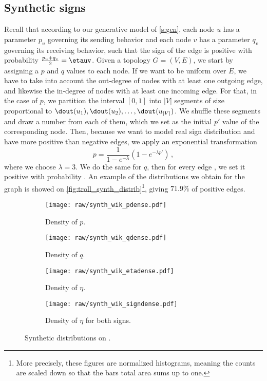 \subsection{Synthetic signs}

Recall that according to our generative model of \autoref{s:gen}, each node $u$ has a parameter $p_u$
governing its sending behavior and each node $v$ has a parameter $q_v$ governing its receiving
behavior, such that the sign of the edge \euv{} is positive with probability $\frac{p_u+q_v}{2} =
\etauv$. Given a topology $G=(V,E)$, we start by assigning a $p$ and $q$ values to each node. If we
want \etauv{} to be uniform over $E$, we have to take into account the out-degree of nodes with at
least one outgoing edge, and likewise the in-degree of nodes with at least one incoming edge. For
that, in the case of $p$, we partition the interval $[0,1]$ into $|V|$ segments of size proportional
to $\dout(u_1),
\dout(u_2), \ldots, \dout(u_{|V|})$. We shuffle these segments and draw a number \uar{} from each of
them, which we set as the initial $p'$ value of the corresponding node. Then, because we want to model real
sign distribution and have more
positive than negative edges, we apply an exponential transformation \[ p = \frac{1}{1-e^{-\lambda}}
\left( 1-e^{-\lambda p'} \right) \,,\] where we choose $\lambda=3$. We do the same for $q$, then for
every edge \euv{}, we set it positive with probability \etauv{}. An example of the distributions we
obtain for the \wik{} graph is showed on \autoref{fig:troll_synth_distrib}\footnote{More precisely,
these figures are normalized histograms, meaning the counts are scaled down so that the bars total
area sums up to one.}, giving $71.9\%$ of positive edges.

\begin{figure*}[hbtp]
  \centering
  \begin{subfigure}[b]{0.401\textwidth} 
    \centering
    \texttt{[image: raw/synth\_wik\_pdense.pdf]}
    \caption{Density of $p$.}
  \end{subfigure}\quad
  \begin{subfigure}[b]{0.401\textwidth} 
    \centering
    \texttt{[image: raw/synth\_wik\_qdense.pdf]}
    \caption{Density of $q$.}
  \end{subfigure}

  \begin{subfigure}[b]{0.401\textwidth} 
    \centering
    \texttt{[image: raw/synth\_wik\_etadense.pdf]}
    \caption{Density of $\eta$.}
  \end{subfigure}\quad
  \begin{subfigure}[b]{0.401\textwidth} 
    \centering
    \texttt{[image: raw/synth\_wik\_signdense.pdf]}
    \caption{Density of $\eta$ for both signs.}
  \end{subfigure}
  \caption{Synthetic distributions on \wik{}.} 
  \label{fig:troll_synth_distrib} 
\end{figure*}

